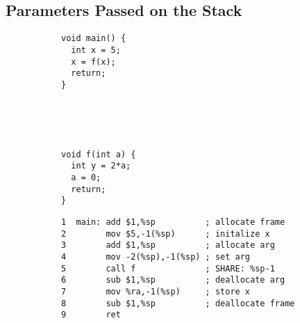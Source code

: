 \documentclass[acmsmall,review,anonymous]{acmart}\settopmatter{printfolios=true,printccs=false,printacmref=false}
\begin{document}
\subsection{Parameters Passed on the Stack}
\label{sec:passing}

\newcommand{\mainpassc}{magenta}

\begin{figure}
  \centering
  \begin{subfigure}[t]{.2\textwidth}
{\small
\begin{verbatim}
void main() {
  int x = 5;
  x = f(x);
  return;
}





void f(int a) {
  int y = 2*a;
  a = 0;
  return;
}
\end{verbatim}
}
  \end{subfigure}
  \begin{subfigure}[t]{.6\textwidth}
{\small
\begin{verbatim}
1  main: add $1,%sp          ; allocate frame
2        mov $5,-1(%sp)      ; initalize x
3        add $1,%sp          ; allocate arg
4        mov -2(%sp),-1(%sp) ; set arg
5        call f              ; SHARE: %sp-1
6        sub $1,%sp          ; deallocate arg
7        mov %ra,-1(%sp)     ; store x
8        sub $1,%sp          ; deallocate frame
9        ret


\end{verbatim}}
\end{subfigure}
\end{figure}
\end{document}
